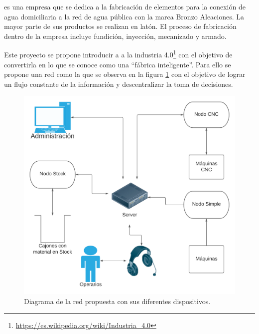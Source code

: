 \documentclass[11pt]{charter}
\begin{document}
\empclientename es una empresa que se dedica a la fabricación de elementos para la conexión de agua domiciliaria a la red de agua pública con la marca Bronzo Aleaciones. La mayor parte de sus productos se realizan en latón. El proceso de fabricación dentro de la empresa incluye fundición, inyección, mecanizado y armado.

Este proyecto se propone introducir a \empclientename a la industria 4.0\footnote{\url{https://es.wikipedia.org/wiki/Industria_4.0}} con el objetivo de convertirla en lo que se conoce como una ``fábrica inteligente''. Para ello se propone una red como la que se observa en la figura \ref{fig:DiagramaRed} con el objetivo de lograr un flujo constante de la información y descentralizar la toma de decisiones.




\begin{figure}[H]
    \centering
    \includegraphics[scale=0.5]{Figuras/diagBloquesRed.png}
    \caption{Diagrama de la red propuesta con sus diferentes dispositivos.}
    \label{fig:DiagramaRed}
\end{figure}
\end{document}
